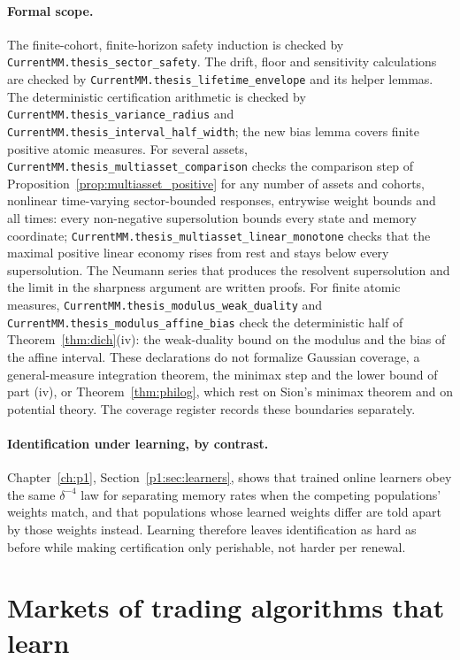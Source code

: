\paragraph{Formal scope.}
The finite-cohort, finite-horizon safety induction is checked by \nolinkurl{CurrentMM.thesis_sector_safety}. The drift, floor and sensitivity calculations are checked by \nolinkurl{CurrentMM.thesis_lifetime_envelope} and its helper lemmas. The deterministic certification arithmetic is checked by \nolinkurl{CurrentMM.thesis_variance_radius} and \nolinkurl{CurrentMM.thesis_interval_half_width}; the new bias lemma covers finite positive atomic measures. For several assets, \nolinkurl{CurrentMM.thesis_multiasset_comparison} checks the comparison step of Proposition~\ref{prop:multiasset_positive} for any number of assets and cohorts, nonlinear time-varying sector-bounded responses, entrywise weight bounds and all times: every non-negative supersolution bounds every state and memory coordinate; \nolinkurl{CurrentMM.thesis_multiasset_linear_monotone} checks that the maximal positive linear economy rises from rest and stays below every supersolution. The Neumann series that produces the resolvent supersolution and the limit in the sharpness argument are written proofs. For finite atomic measures, \nolinkurl{CurrentMM.thesis_modulus_weak_duality} and \nolinkurl{CurrentMM.thesis_modulus_affine_bias} check the deterministic half of Theorem~\ref{thm:dich}(iv): the weak-duality bound on the modulus and the bias of the affine interval. These declarations do not formalize Gaussian coverage, a general-measure integration theorem, the minimax step and the lower bound of part (iv), or Theorem~\ref{thm:philog}, which rest on Sion's minimax theorem and on potential theory. The coverage register records these boundaries separately.

\paragraph{Identification under learning, by contrast.} Chapter~\ref{ch:p1}, Section~\ref{p1:sec:learners}, shows that trained online learners obey the same $\delta^{-4}$ law for separating memory rates when the competing populations' weights match, and that populations whose learned weights differ are told apart by those weights instead. Learning therefore leaves identification as hard as before while making certification only perishable, not harder per renewal.

\section{Markets of trading algorithms that learn}\label{sec:bl_ai}

